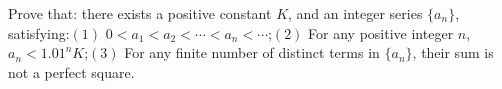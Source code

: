 Prove that: there exists a positive constant $K$,  and an integer series $\{a_n\}$,  satisfying:$(1)$ $0<a_1<a_2<\cdots <a_n<\cdots $;$(2)$ For any positive integer $n$,  $a_n<1.01^n K$;$(3)$ For any finite number of distinct terms in $\{a_n\}$,  their sum is not a perfect square.